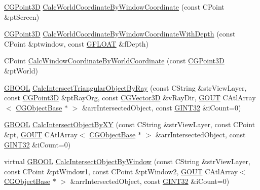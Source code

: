 \begin{DoxyCompactItemize}
\hyperlink{class_c_g_point3_d}{C\+G\+Point3\+D} \hyperlink{class_c_g3_d_view_aa10f083d6a1a32ae4e87e854447df1f0}{Calc\+World\+Coordinate\+By\+Window\+Coordinate} (const C\+Point \&pt\+Screen)
\item 
\hyperlink{class_c_g_point3_d}{C\+G\+Point3\+D} \hyperlink{class_c_g3_d_view_ad2e0f1287dc53e3b81d3a882c6a54ac9}{Calc\+World\+Coordinate\+By\+Window\+Coordinate\+With\+Depth} (const C\+Point \&ptwindow, const \hyperlink{_g_types_8h_abf6eba8223df62f199b811a6c52ff2ef}{G\+F\+L\+O\+A\+T} \&f\+Depth)
\item 
C\+Point \hyperlink{class_c_g3_d_view_a2c8cb9988023e6b84767b0379ef03f83}{Calc\+Window\+Coordinate\+By\+World\+Coordinate} (const \hyperlink{class_c_g_point3_d}{C\+G\+Point3\+D} \&pt\+World)
\item 
\hyperlink{_g_types_8h_a2901915743626352a6820c5405f556dc}{G\+B\+O\+O\+L} \hyperlink{class_c_g3_d_view_ac66c57492243b3790103ab4156309052}{Calc\+Intersect\+Triangular\+Object\+By\+Ray} (const C\+String \&str\+View\+Layer, const \hyperlink{class_c_g_point3_d}{C\+G\+Point3\+D} \&pt\+Ray\+Org, const \hyperlink{_g_point3_d_8h_aa7e73d39f4c991acb5a13c84b498366d}{C\+G\+Vector3\+D} \&v\+Ray\+Dir, \hyperlink{_g_types_8h_a0858ec221262e635612871d70ca233ad}{G\+O\+U\+T} C\+Atl\+Array$<$ \hyperlink{class_c_g_object_base}{C\+G\+Object\+Base} $\ast$ $>$ \&arr\+Intersected\+Object, const \hyperlink{_g_types_8h_a40d8bc7c06b9e72906852691a4bf888e}{G\+I\+N\+T32} \&i\+Count=0)
\item 
\hyperlink{_g_types_8h_a2901915743626352a6820c5405f556dc}{G\+B\+O\+O\+L} \hyperlink{class_c_g3_d_view_ad0028c5dcb4b7fdb69b4230cdf6b8fbd}{Calc\+Intersect\+Object\+By\+X\+Y} (const C\+String \&str\+View\+Layer, const C\+Point \&pt, \hyperlink{_g_types_8h_a0858ec221262e635612871d70ca233ad}{G\+O\+U\+T} C\+Atl\+Array$<$ \hyperlink{class_c_g_object_base}{C\+G\+Object\+Base} $\ast$ $>$ \&arr\+Intersected\+Object, const \hyperlink{_g_types_8h_a40d8bc7c06b9e72906852691a4bf888e}{G\+I\+N\+T32} \&i\+Count=0)
\item 
virtual \hyperlink{_g_types_8h_a2901915743626352a6820c5405f556dc}{G\+B\+O\+O\+L} \hyperlink{class_c_g3_d_view_ac034e96c79fe1634021040c4ea2b1a64}{Calc\+Intersect\+Object\+By\+Window} (const C\+String \&str\+View\+Layer, const C\+Point \&pt\+Window1, const C\+Point \&pt\+Window2, \hyperlink{_g_types_8h_a0858ec221262e635612871d70ca233ad}{G\+O\+U\+T} C\+Atl\+Array$<$ \hyperlink{class_c_g_object_base}{C\+G\+Object\+Base} $\ast$ $>$ \&arr\+Intersected\+Object, const \hyperlink{_g_types_8h_a40d8bc7c06b9e72906852691a4bf888e}{G\+I\+N\+T32} \&i\+Count=0)

\end{DoxyCompactItemize}
